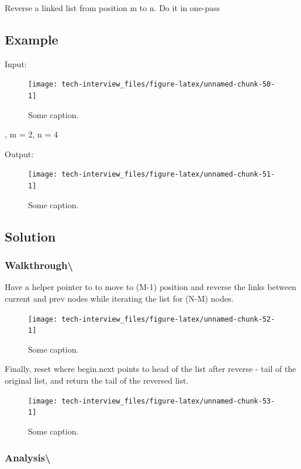 \documentclass[]{book}
\begin{document}
Reverse a linked list from position m to n. Do it in one-pass

\hypertarget{example-84}{%
\subsection{Example}\label{example-84}}

Input:

\begin{figure}
\texttt{[image: tech-interview\_files/figure-latex/unnamed-chunk-50-1]} \caption{Some caption.}\label{fig:unnamed-chunk-50}
\end{figure}

, m = 2, n = 4

Output:

\begin{figure}
\texttt{[image: tech-interview\_files/figure-latex/unnamed-chunk-51-1]} \caption{Some caption.}\label{fig:unnamed-chunk-51}
\end{figure}

\hypertarget{solution-60}{%
\subsection{Solution}\label{solution-60}}

\hypertarget{walkthrough-103}{%
\subsubsection{Walkthrough\textbackslash{}}\label{walkthrough-103}}

Have a helper pointer to to move to (M-1) position and reverse the links between current and prev nodes while
iterating the list for (N-M) nodes.

\begin{figure}
\texttt{[image: tech-interview\_files/figure-latex/unnamed-chunk-52-1]} \caption{Some caption.}\label{fig:unnamed-chunk-52}
\end{figure}

Finally, reset where begin.next points to head of the list after reverse - tail of the original list, and return the
tail of the reversed list.

\begin{figure}
\texttt{[image: tech-interview\_files/figure-latex/unnamed-chunk-53-1]} \caption{Some caption.}\label{fig:unnamed-chunk-53}
\end{figure}

\hypertarget{analysis-110}{%
\subsubsection{Analysis\textbackslash{}}\label{analysis-110}}
\end{document}
